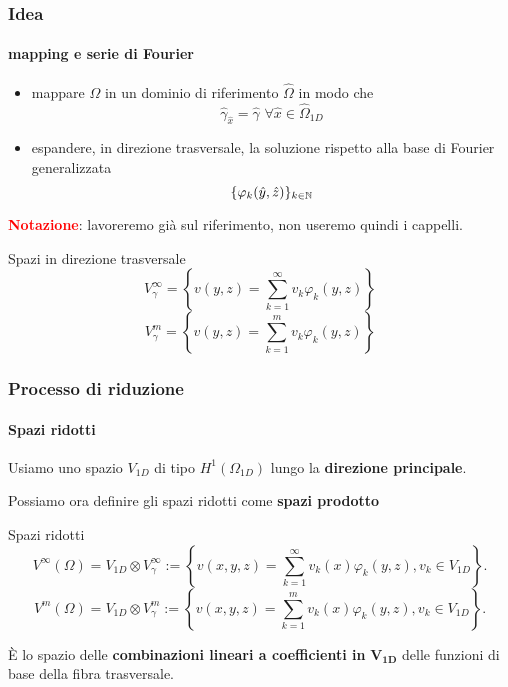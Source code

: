  \begin{frame}
 \frametitle{Idea}
 \framesubtitle{mapping e serie di Fourier}
 \begin{itemize}
  \item mappare $\Omega$ in un dominio di riferimento $\widehat \Omega$ in modo che $$\hat \gamma_{\hat x}=\hat \gamma\,\,\forall \hat x\in\widehat\Omega_{1D}$$
  \item espandere, in direzione trasversale, la soluzione rispetto alla base di Fourier generalizzata $$\{\varphi_k(\hat y,\hat z)\}_{k\in\mathbb{N}}$$
 \end{itemize}
 \textcolor{red}{\footnotesize\textbf{Notazione}}{\footnotesize: lavoreremo gi\`a sul riferimento, non useremo quindi i cappelli.}
 \begin{block}{Spazi in direzione trasversale}
 \footnotesize
  $$V^\infty_\gamma=\left\{v(y,z)=\sum_{k=1}^\infty v_k\varphi_k(y,z)\right\}$$
  $$V^m_\gamma=\left\{v(y,z)=\sum_{k=1}^m v_k\varphi_k(y,z)\right\}$$
 \end{block}
 \end{frame}
\begin{frame}
 \frametitle{Processo di riduzione}
 \framesubtitle{Spazi ridotti}
 Usiamo uno spazio $V_{1D}$ di tipo $H^1(\Omega_{1D})$ lungo la \textbf{direzione principale}.
 
 Possiamo ora definire gli spazi ridotti come \textbf{spazi prodotto}
 \begin{exampleblock}{Spazi ridotti}
 {\footnotesize
  $$V^\infty(\Omega)=V_{1D}\otimes V^\infty_\gamma:=\left\{v(x,y,z)=\sum_{k=1}^\infty v_k(x)\varphi_k(y,z), v_k\in V_{1D}\right\}.$$
  $$V^m(\Omega)=V_{1D}\otimes V^m_\gamma:=\left\{v(x,y,z)=\sum_{k=1}^m v_k(x)\varphi_k(y,z), v_k\in V_{1D}\right\}.$$
  }
  
  \`E lo spazio delle \textbf{combinazioni lineari a coefficienti in} $\mathbf{V_{1D}}$ delle funzioni di base della fibra trasversale.
  \end{exampleblock}
\end{frame}


